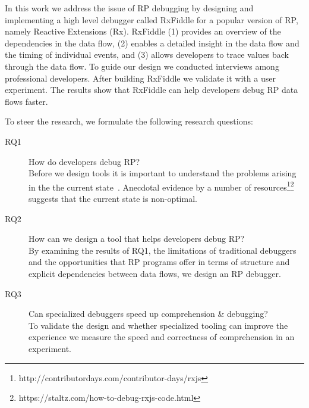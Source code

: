 In this work we address the issue of RP debugging by designing and implementing a high level debugger called RxFiddle for a popular version of RP, namely Reactive Extensions (Rx). RxFiddle  (1) provides an overview of the dependencies in the data flow, (2) enables a detailed insight in the data flow and the timing of individual events, and (3) allows developers to trace values back through the data flow. To guide our design we conducted interviews among professional developers. After building RxFiddle we validate it with a user experiment. The results show that RxFiddle can help developers debug RP data flows faster.

To steer the research, we formulate the following research questions:

\begin{description}
\item[RQ1] How do developers debug RP? \\
Before we design tools it is important to understand the problems arising in the the current state~\cite{singer2010examination}. Anecdotal evidence by a number of resources\footnote{\label{foot:contribdays}http://contributordays.com/contributor-days/rxjs}\footnote{https://staltz.com/how-to-debug-rxjs-code.html}
suggests that the current state is non-optimal.

\item[RQ2] How can we design a tool that helps developers debug RP? \\
By examining the results of RQ1, the limitations of traditional debuggers and the opportunities that RP programs offer in terms of structure and explicit dependencies between data flows, we design an RP debugger.

\item[RQ3] Can specialized debuggers speed up comprehension \& debugging? \\
To validate the design and whether specialized tooling can improve the experience we measure the speed and correctness of comprehension in an experiment.

\end{description}
